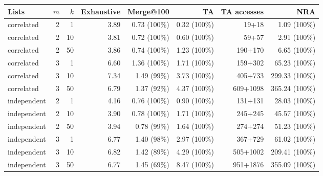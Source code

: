 \begin{tabular}{lrrrrrrr}
\toprule
Lists & $m$ & $k$ & Exhaustive & Merge@100 & TA & TA accesses & NRA \\
\midrule
correlated & 2 & 1 & 3.89 & 0.73 (100\%) & 0.32 (100\%) & 19+18 & 1.09 (100\%) \\
correlated & 2 & 10 & 3.81 & 0.72 (100\%) & 0.60 (100\%) & 59+57 & 2.91 (100\%) \\
correlated & 2 & 50 & 3.86 & 0.74 (100\%) & 1.23 (100\%) & 190+170 & 6.65 (100\%) \\
correlated & 3 & 1 & 6.60 & 1.36 (100\%) & 1.71 (100\%) & 159+302 & 65.23 (100\%) \\
correlated & 3 & 10 & 7.34 & 1.49 (99\%) & 3.73 (100\%) & 405+733 & 299.33 (100\%) \\
correlated & 3 & 50 & 6.79 & 1.37 (92\%) & 4.37 (100\%) & 609+1098 & 365.24 (100\%) \\
\midrule
independent & 2 & 1 & 4.16 & 0.76 (100\%) & 0.90 (100\%) & 131+131 & 28.03 (100\%) \\
independent & 2 & 10 & 3.90 & 0.78 (100\%) & 1.71 (100\%) & 245+245 & 45.57 (100\%) \\
independent & 2 & 50 & 3.94 & 0.78 (99\%) & 1.64 (100\%) & 274+274 & 51.23 (100\%) \\
independent & 3 & 1 & 6.77 & 1.40 (98\%) & 2.97 (100\%) & 367+729 & 61.02 (100\%) \\
independent & 3 & 10 & 6.82 & 1.42 (89\%) & 4.29 (100\%) & 505+1002 & 209.41 (100\%) \\
independent & 3 & 50 & 6.77 & 1.45 (69\%) & 8.47 (100\%) & 951+1876 & 355.09 (100\%) \\
\bottomrule
\end{tabular}
